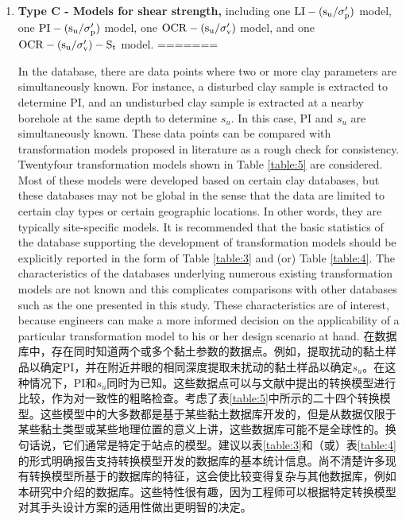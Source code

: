 \begin{paracol}{2}
\begin{enumerate}
        \item \textbf{Type C - Models for shear strength,} including one $\rm{LI}-(s_u/\sigma_p')$ model, one $\rm{PI}-(s_u/\sigma_p')$ model, one $\rm{OCR}-(s_u/\sigma_v')$ model, and one $\rm{OCR}-(s_u/\sigma_v')-S_t$ model. 
=======
\begin{Parallel}{0.60\textwidth}{}
    \ParallelLText
    {
        In the database, there are data points where two or more clay parameters are simultaneously known. For instance, a disturbed clay sample is extracted to determine PI, and an undisturbed clay sample is extracted at a nearby borehole at the same depth to determine $s_u$. In this case, PI and $s_u$ are simultaneously known. These data points can be compared with transformation models proposed in literature as a rough check for consistency. Twentyfour transformation models shown in Table \ref{table:5} are considered. Most of these models were developed based on certain clay databases, but these databases may not be global in the sense that the data are limited to certain clay types or certain geographic locations. In other words, they are typically site-specific models. It is recommended that the basic statistics of the database supporting the development of transformation models should be explicitly reported in the form of Table \ref{table:3} and (or) Table \ref{table:4}. The characteristics of the databases underlying numerous existing transformation models are not known and this complicates comparisons with other databases such as the one presented in this study. These characteristics are of interest, because engineers can make a more informed decision on the applicability of a particular transformation model to his or her design scenario at hand.
    }
    \ParallelRText
    {
        在数据库中，存在同时知道两个或多个黏土参数的数据点。例如，提取扰动的黏土样品以确定PI，并在附近井眼的相同深度提取未扰动的黏土样品以确定$s_u$。在这种情况下，PI和$s_u$同时为已知。这些数据点可以与文献中提出的转换模型进行比较，作为对一致性的粗略检查。考虑了表\ref{table:5}中所示的二十四个转换模型。这些模型中的大多数都是基于某些黏土数据库开发的，但是从数据仅限于某些黏土类型或某些地理位置的意义上讲，这些数据库可能不是全球性的。换句话说，它们通常是特定于站点的模型。建议以表\ref{table:3}和（或）表\ref{table:4}的形式明确报告支持转换模型开发的数据库的基本统计信息。尚不清楚许多现有转换模型所基于的数据库的特征，这会使比较变得复杂与其他数据库，例如本研究中介绍的数据库。这些特性很有趣，因为工程师可以根据特定转换模型对其手头设计方案的适用性做出更明智的决定。
    }
    \ParallelPar
    
    \ParallelLText

\end{Parallel}
\end{enumerate}
\end{paracol}
